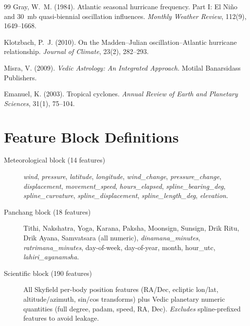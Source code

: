 \documentclass[12pt,a4paper]{article}
\begin{document}
\begin{thebibliography}{99}
Gray, W.~M. (1984).
Atlantic seasonal hurricane frequency. Part I: El Ni\~no and 30~mb
quasi-biennial oscillation influences.
\textit{Monthly Weather Review}, 112(9), 1649--1668.

Klotzbach, P.~J. (2010).
On the Madden--Julian oscillation--Atlantic hurricane relationship.
\textit{Journal of Climate}, 23(2), 282--293.

Misra, V. (2009).
\textit{Vedic Astrology: An Integrated Approach.}
Motilal Banarsidass Publishers.

Emanuel, K. (2003).
Tropical cyclones.
\textit{Annual Review of Earth and Planetary Sciences}, 31(1), 75--104.

\end{thebibliography}

\appendix

\section{Feature Block Definitions}
\label{app:blocks}

\begin{description}
  \item[Meteorological block (14 features)] \textit{wind}, \textit{pressure},
    \textit{latitude}, \textit{longitude}, \textit{wind\_change},
    \textit{pressure\_change}, \textit{displacement}, \textit{movement\_speed},
    \textit{hours\_elapsed}, \textit{spline\_bearing\_deg},
    \textit{spline\_curvature}, \textit{spline\_displacement},
    \textit{spline\_length\_deg}, \textit{elevation}.
  \item[Panchang block (18 features)] Tithi, Nakshatra, Yoga, Karana,
    Paksha, Moonsign, Sunsign, Drik Ritu, Drik Ayana, Samvatsara (all numeric),
    \textit{dinamana\_minutes}, \textit{ratrimana\_minutes}, day-of-week,
    day-of-year, month, hour\_utc, \textit{lahiri\_ayanamsha}.
  \item[Scientific block (190 features)] All Skyfield per-body position
    features (RA/Dec, ecliptic lon/lat, altitude/azimuth, sin/cos transforms)
    plus Vedic planetary numeric quantities (full degree, padam, speed, RA,
    Dec). \emph{Excludes} spline-prefixed features to avoid leakage.
\end{description}
\end{document}
